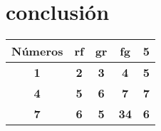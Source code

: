 \section{conclusión}

\begin{table}[]
    \begin{tabular}{|c|c|c|c|c|}
    \hline
    \textbf{Números} & \textbf{rf} & \textbf{gr} & \textbf{fg} & \textbf{5}  \\ \hline
    \textbf{1}       & \textbf{2}  & \textbf{3}  & \textbf{4}  & \textbf{5} \\ \hline
    \textbf{4}       & \textbf{5}  & \textbf{6}  & \textbf{7}  & \textbf{7} \\ \hline
    \textbf{7}       & \textbf{6}  & \textbf{5}  & \textbf{34} & \textbf{6} \\ \hline
    \end{tabular}
    \end{table}